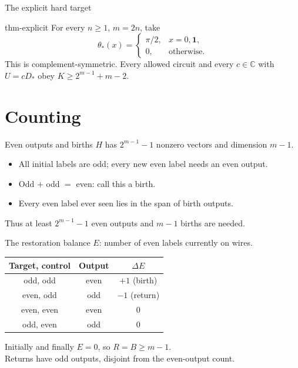 \documentclass{beamer}
\begin{document}
\begin{frame}{The explicit hard target}
\begin{bookresult}{thm-explicit}
For every $n\geq1$, $m=2n$, take
\[\theta_*(x)=\begin{cases}\pi/2,&x=0,\mathbf1,\\0,&\text{otherwise}.\end{cases}\]
This is complement-symmetric. Every allowed circuit and every $c\in\mathbb C$ with $U=cD_*$ obey
$K\geq2^{m-1}+m-2$.
\end{bookresult}
\end{frame}
\section{Counting}
\begin{frame}{Even outputs and births}
$H$ has $2^{m-1}-1$ nonzero vectors and dimension $m-1$.
\begin{itemize}
\item All initial labels are odd; every new even label needs an even output.
\item Odd $+$ odd $=$ even: call this a birth.
\item Every even label ever seen lies in the span of birth outputs.
\end{itemize}
Thus at least $2^{m-1}-1$ even outputs and $m-1$ births are needed.
\end{frame}
\begin{frame}{The restoration balance}
$E$: number of even labels currently on wires.
\begin{center}\begin{tabular}{c|c|c}
Target, control & Output & $\Delta E$\\\hline
odd, odd & even & $+1$ (birth)\\
even, odd & odd & $-1$ (return)\\
even, even & even & $0$\\
odd, even & odd & $0$
\end{tabular}\end{center}
Initially and finally $E=0$, so $R=B\geq m-1$.\\[.4em]
Returns have odd outputs, disjoint from the even-output count.
\end{frame}
\end{document}
